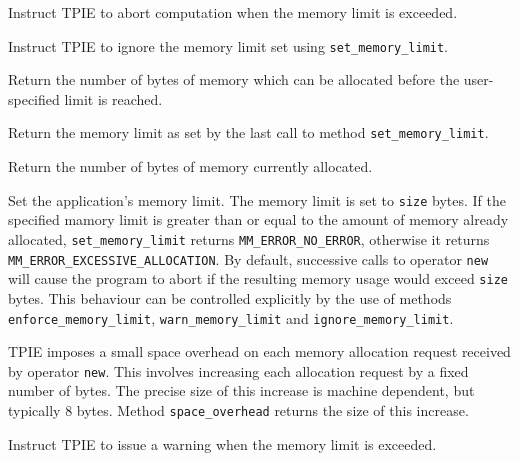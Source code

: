      {Instruct TPIE to
    abort computation when the memory limit is exceeded.}

     {Instruct TPIE to
    ignore the memory limit set using \lstinline|set_memory_limit|.}

     {Return the number of
    bytes of memory which can be allocated before the user-specified limit
    is reached.}

  \etabb
  
  \btabb
     {Return the memory limit as
    set by the last call to method \lstinline|set_memory_limit|.}

     {Return the number of bytes
    of memory currently allocated.}

     {Set the
    application's memory limit. The memory limit is set to \lstinline|size|
    bytes. If the specified mamory limit is greater than or equal to the
    amount of memory already allocated, \lstinline|set_memory_limit| returns
    \lstinline|MM_ERROR_NO_ERROR|, otherwise it returns
    \lstinline|MM_ERROR_EXCESSIVE_ALLOCATION|. By default, successive calls
    to operator \lstinline|new| will cause the program to abort if the
    resulting memory usage would exceed \lstinline|size| bytes. This behaviour
    can be controlled explicitly by the use of methods
    \lstinline|enforce_memory_limit|, \lstinline|warn_memory_limit| and
    \lstinline|ignore_memory_limit|.}

     {TPIE imposes a small space
    overhead on each memory allocation request received by operator
    \lstinline|new|. This involves increasing each allocation request by a
    fixed number of bytes. The precise size of this increase is machine
    dependent, but typically 8 bytes. Method \lstinline|space_overhead|
    returns the size of this increase.}

     {Instruct TPIE to
    issue a warning when the memory limit is exceeded.}

  \etabb
{}



